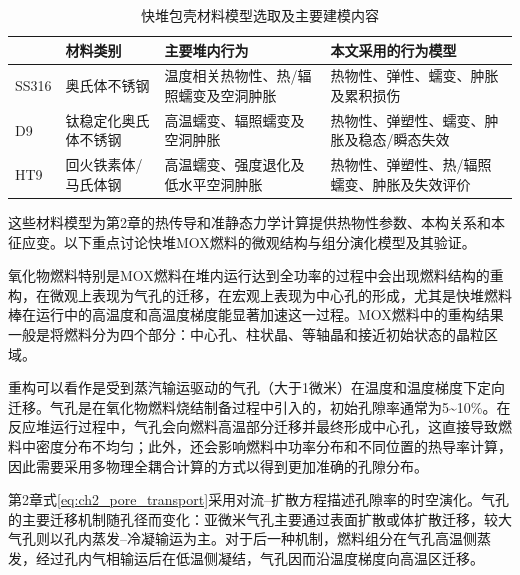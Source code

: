 \begin{table}[htbp]
	\centering
	\caption{快堆包壳材料模型选取及主要建模内容}
	\label{tab:ch3_cladding_model_selection}
	\begin{tabularx}{\textwidth}{@{}
			>{\centering\arraybackslash}m{2.0cm}
			>{\centering\arraybackslash}m{3.0cm}
			>{\centering\arraybackslash}X
			>{\centering\arraybackslash}X
			@{}}
		\toprule
		{\centering 材料\par} & {\centering 材料类别\par} & {\centering 主要堆内行为\par} & {\centering 本文采用的行为模型\par} \\
		\midrule
		SS316 & 奥氏体不锈钢 & 温度相关热物性、热/辐照蠕变及空洞肿胀 & 热物性、弹性、蠕变、肿胀及累积损伤 \\
		D9 & 钛稳定化奥氏体不锈钢 & 高温蠕变、辐照蠕变及空洞肿胀 & 热物性、弹塑性、蠕变、肿胀及稳态/瞬态失效 \\
		HT9 & 回火铁素体/马氏体钢 & 高温蠕变、强度退化及低水平空洞肿胀 & 热物性、弹塑性、热/辐照蠕变、肿胀及失效评价 \\
		\bottomrule
	\end{tabularx}
\end{table}

这些材料模型为第2章的热传导和准静态力学计算提供热物性参数、本构关系和本征应变。以下重点讨论快堆MOX燃料的微观结构与组分演化模型及其验证。

\label{sec:pore_migration}

氧化物燃料特别是MOX燃料在堆内运行达到全功率的过程中会出现燃料结构的重构，在微观上表现为气孔的迁移，在宏观上表现为中心孔的形成，尤其是快堆燃料棒在运行中的高温度和高温度梯度能显著加速这一过程。MOX燃料中的重构结果一般是将燃料分为四个部分：中心孔、柱状晶、等轴晶和接近初始状态的晶粒区域。

重构可以看作是受到蒸汽输运驱动的气孔（大于1微米）在温度和温度梯度下定向迁移。气孔是在氧化物燃料烧结制备过程中引入的，初始孔隙率通常为5\~{}10\%。在反应堆运行过程中，气孔会向燃料高温部分迁移并最终形成中心孔，这直接导致燃料中密度分布不均匀；此外，还会影响燃料中功率分布和不同位置的热导率计算，因此需要采用多物理全耦合计算的方式以得到更加准确的孔隙分布。

第2章式\eqref{eq:ch2_pore_transport}采用对流--扩散方程描述孔隙率的时空演化。气孔的主要迁移机制随孔径而变化：亚微米气孔主要通过表面扩散或体扩散迁移，较大气孔则以孔内蒸发--冷凝输运为主\cite{kanekoCalculationProgramMIVOID1969,vanceComputerSimulationPore2017,sensKineticsPoreMovement1972,ronchiPropertiesLenticularPores1974,novasconeModelingPorosityMigration2018,wellandMatterTransportFast2020}。对于后一种机制，燃料组分在气孔高温侧蒸发，经过孔内气相输运后在低温侧凝结，气孔因而沿温度梯度向高温区迁移\cite{sensKineticsPoreMovement1972}。

